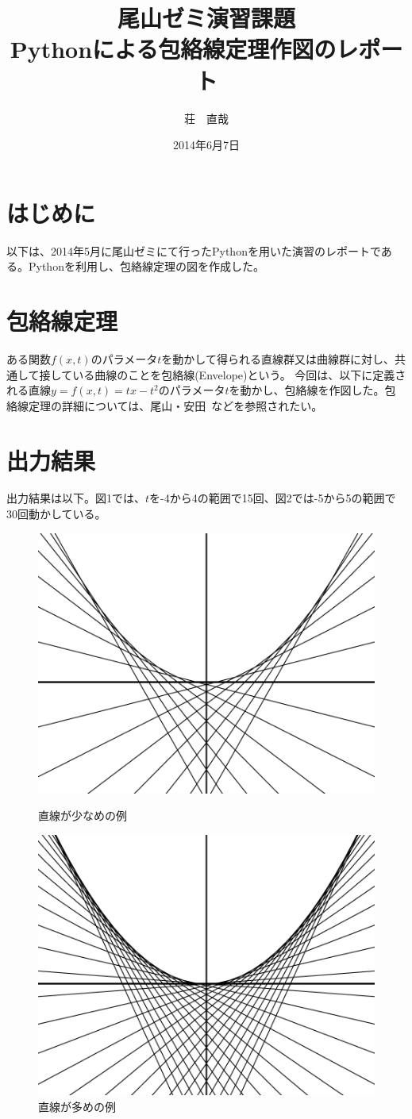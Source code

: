 \documentclass[11pt,a4j,fleqn]{jarticle}
\title{尾山ゼミ演習課題\\Pythonによる包絡線定理作図のレポート}
\author{荘　直哉}
\date{2014年6月7日}
\begin{document}
\maketitle

\section{はじめに}

以下は、2014年5月に尾山ゼミにて行ったPythonを用いた演習のレポートである。Pythonを利用し、包絡線定理の図を作成した。


\section{包絡線定理}
ある関数$f(x,t)$のパラメータ$t$を動かして得られる直線群又は曲線群に対し、共通して接している曲線のことを包絡線(Envelope)という。
今回は、以下に定義される直線$y=f(x, t) = tx - t^2$のパラメータ$t$を動かし、包絡線を作図した。包絡線定理の詳細については、尾山・安田~\cite{OyamaYasuda11}などを参照されたい。

\section{出力結果}
出力結果は以下。図1では、$t$を-4から4の範囲で15回、図2では-5から5の範囲で30回動かしている。

\begin{figure}[!b]
  \centering
  \begin{minipage}{0.4\columnwidth}
    \includegraphics[width=0.3\columnwidth]{envelope0.pdf}
    \caption{直線が少なめの例}
    \label{fig:1}
  \end{minipage}
  \hspace{1cm}
  \begin{minipage}{0.4\columnwidth}
    \includegraphics[width=0.3\columnwidth]{envelope1.pdf}
    \caption{直線が多めの例}
    \label{fig:2}
  \end{minipage}
\end{figure}
\end{document}
